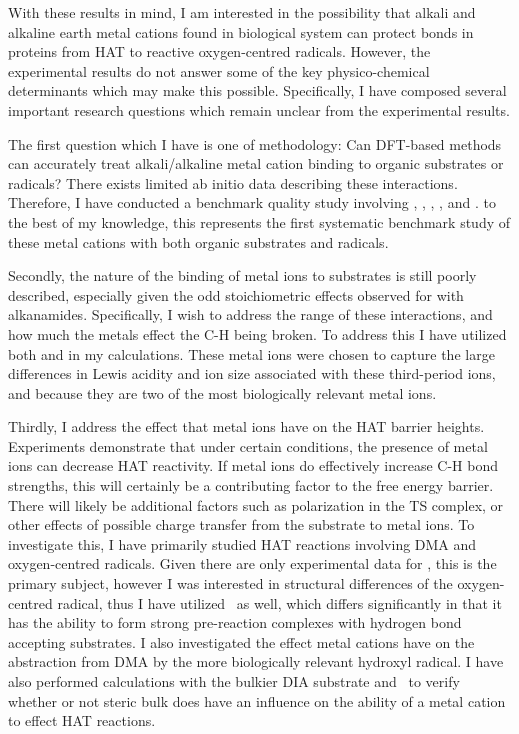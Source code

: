 With these results in mind, I am interested in the possibility that alkali and alkaline earth metal cations found in biological system can protect  bonds in proteins from HAT to reactive oxygen-centred radicals. However, the experimental results do not answer some of the key physico-chemical determinants which may make this possible. Specifically, I have composed several important research questions which remain unclear from the experimental results.

The first question which I have is one of methodology: Can DFT-based methods can accurately treat alkali/alkaline metal cation binding to organic substrates or radicals? There exists limited ab initio data describing these interactions.\cite{ Siu2001, Corral2003, Suarez2011, Baldauf2013} Therefore, I have conducted a benchmark quality study involving , , , , and . to the best of my knowledge, this represents the first systematic benchmark study of these metal cations with both organic substrates and radicals.

Secondly, the nature of the binding of metal ions to substrates is still poorly described, especially given the odd stoichiometric effects observed for  with alkanamides. Specifically, I wish to address the range of these interactions, and how much the metals effect the C-H being broken. To address this I have utilized both  and  in my calculations. These metal ions were chosen to capture the large differences in Lewis acidity and ion size associated with these third-period ions, and because they are two of the most biologically relevant metal ions.

Thirdly, I address the effect that metal ions have on the HAT barrier heights. Experiments demonstrate that under certain conditions, the presence of metal ions can decrease HAT reactivity. If metal ions do effectively increase C-H bond strengths, this will certainly be a contributing factor to the free energy barrier. There will likely be additional factors such as polarization in the TS complex, or other effects of possible charge transfer from the substrate to metal ions. To investigate this, I have primarily studied HAT reactions involving DMA and oxygen-centred radicals. Given there are only experimental data for \cumo, this is the primary subject, however I was interested in structural differences of the oxygen-centred radical, thus I have utilized \bno\ as well, which differs significantly in that it has the ability to form strong pre-reaction complexes with hydrogen bond accepting substrates.\cite{Salamone2012, Salamone2013} I also investigated the effect metal cations have on the abstraction from DMA by the more biologically relevant hydroxyl radical. I have also performed calculations with the bulkier DIA substrate and \cumo\ to verify whether or not steric bulk does have an influence on the ability of a metal cation to effect HAT reactions.

